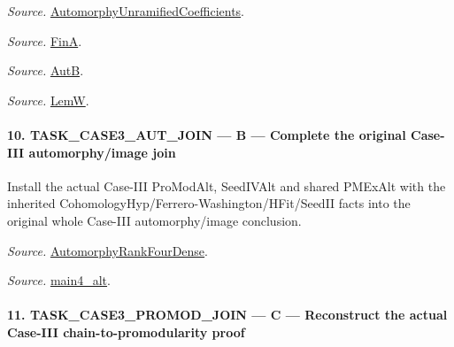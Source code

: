 \emph{Source.} \href{https://github.com/CocoSgt/riemann-hypothesis-lean/blob/7cbf7a0c32fca1badf05931879a37c3f8a2b03b4/src/Development/AutomorphicArithmetic/AutomorphicVarieties/AutomorphicCases/AutomorphyUnramifiedCoefficients.lean#L24-L27}{AutomorphyUnramifiedCoefficients}.

\emph{Source.} \href{https://github.com/CocoSgt/riemann-hypothesis-lean/blob/7cbf7a0c32fca1badf05931879a37c3f8a2b03b4/src/Development/AutomorphicArithmetic/AutomorphicVarieties/AutomorphicCases/AutomorphyUnramifiedCoefficients.lean#L12-L13}{FinA}.

\emph{Source.} \href{https://github.com/CocoSgt/riemann-hypothesis-lean/blob/7cbf7a0c32fca1badf05931879a37c3f8a2b03b4/src/Development/AutomorphicArithmetic/AutomorphicVarieties/AutomorphicCases/AutomorphyUnramifiedCoefficients.lean#L15-L17}{AutB}.

\emph{Source.} \href{https://github.com/CocoSgt/riemann-hypothesis-lean/blob/7cbf7a0c32fca1badf05931879a37c3f8a2b03b4/src/Development/AutomorphicArithmetic/AutomorphicVarieties/AutomorphicCases/AutomorphyUnramifiedCoefficients.lean#L19-L22}{LemW}.



\paragraph{10. TASK\_\allowbreak CASE3\_\allowbreak AUT\_\allowbreak JOIN — B — Complete the original Case-III automorphy/image join}

Install the actual Case-III ProModAlt, SeedIVAlt and shared PMExAlt with the inherited CohomologyHyp/Ferrero-Washington/HFit/SeedII facts into the original whole Case-III automorphy/image conclusion.

\emph{Source.} \href{https://github.com/CocoSgt/riemann-hypothesis-lean/blob/7cbf7a0c32fca1badf05931879a37c3f8a2b03b4/src/Development/AutomorphicArithmetic/AutomorphicVarieties/ModularityArgument/ThresholdArguments/DenseThresholdCases/PromodularityCaseThree.lean#L43-L44}{AutomorphyRankFourDense}.

\emph{Source.} \href{https://github.com/CocoSgt/riemann-hypothesis-lean/blob/7cbf7a0c32fca1badf05931879a37c3f8a2b03b4/src/Development/AutomorphicArithmetic/AutomorphicVarieties/ModularityArgument/ThresholdArguments/DenseThresholdCases/CuFinal.lean#L44-L44}{main4\_\allowbreak alt}.



\paragraph{11. TASK\_\allowbreak CASE3\_\allowbreak PROMOD\_\allowbreak JOIN — C — Reconstruct the actual Case-III chain-to-promodularity proof}

